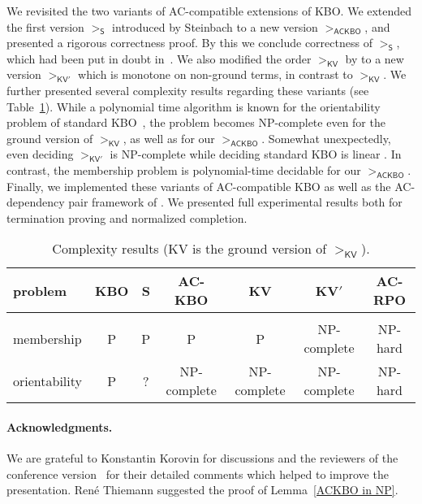 \documentclass{tlp}
\newcommand{\m}[1]{\mathsf{#1}}
\newcommand{\mr}[1]{\mathrm{#1}}
\newcommand{\ackbo}{\mr{\m{ACKBO}}}
\newcommand{\steinbach}{\mr{\m{S}}}
\newcommand{\KV}{\mr{\m{KV}}}
\newcommand{\KVC}{\mr{\m{KV'}}}
\begin{document}
We revisited the two variants of AC-compatible extensions of KBO.
We extended the first version $>_\steinbach$ introduced by Steinbach
\cite{S90} to a new version $>_\ackbo$, and presented a rigorous
correctness
proof. By this we conclude correctness of $>_\steinbach$, which had been
put in doubt in~\cite{KV03b}.
We also modified the order $>_\KV$ by 
to a new version $>_\KVC$ which is 
monotone on non-ground terms, in contrast to $>_\KV$.
We further presented several complexity results regarding these variants
(see Table~\ref{complexity results}).
While a polynomial time algorithm is known for the orientability problem
of standard KBO~\cite{KV03}, the problem becomes NP-complete even
for the ground version of $>_\KV$, as well as for our $>_\ackbo$.
Somewhat unexpectedly, even deciding $>_\KVC$ is NP-complete while
deciding standard KBO is linear \cite{L06b}.
In contrast, the membership problem is polynomial-time decidable
for our $>_\ackbo$.
Finally, we implemented these variants of AC-compatible KBO
as well as the AC-dependency pair framework of
.
We presented full experimental results both for termination proving
and normalized completion.

\begin{table}[t]
\caption{Complexity results (KV is the ground version of $>_\KV$).}
\label{complexity results}
\centering
\begin{tabular}{@{}l@{\quad}c@{~}c@{~}c@{~}c@{~}c@{~}c@{}}
\hline
\phantom{\large $|$}problem & KBO & S & AC-KBO & KV & KV$'$ & AC-RPO \\
\hline
\\[-2.2ex]
membership    & P & P & P & P & NP-complete & NP-hard \\[.5ex]
orientability & P & ? & NP-complete & NP-complete &
NP-complete & NP-hard \\
\hline
\end{tabular}
\end{table}

\paragraph{Acknowledgments.}
We are grateful to Konstantin Korovin for discussions and
the reviewers of the conference version~\cite{YWHM14}
for their detailed comments which helped to improve the presentation.
Ren\'e Thiemann suggested the proof of Lemma~\ref{ACKBO in NP}.



\fi
\end{document}
